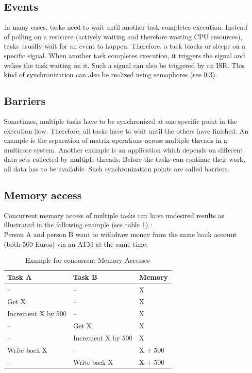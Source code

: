 \subsection{Events}
In many cases, tasks need to wait until another task completes execution.
Instead of polling on a resource (actively waiting and therefore wasting \ac{CPU} resources), tasks usually wait for an event to happen.
Therefore, a task blocks or sleeps on a specific signal.
When another task completes execution, it triggers the signal and wakes the task waiting on it.
Such a signal can also be triggered by an \ac{ISR}.
This kind of synchronization can also be realized using semaphores (see \ref{ss_memory_access}).

\subsection{Barriers}\label{ss_barriers}
Sometimes, multiple tasks have to be synchronized at one specific point in the execution flow.
Therefore, all tasks have to wait until the others have finished.
An example is the separation of matrix operations across multiple threads in a multicore system. 
Another example is an application which depends on different data sets collected by multiple threads.
Before the tasks can continue their work, all data has to be available.
Such synchronization points are called barriers.

\subsection{Memory access}\label{ss_memory_access}
Concurrent memory access of multiple tasks can have undesired results as illustrated in the following example (see table \ref{tab_example_concurrent_memory_access}) :\\
Person A and person B want to withdraw money from the same bank account (both 500 Euros) via an ATM at the same time.

\begin{table}[htbp]
	\centering
		\begin{tabular}{|l|l|l|}
			\hline
				Task A 							& Task B 							& Memory  \\
				\hline 
				-- 									& -- 									& X 			\\
			  Get X 							& -- 									& X				\\
			  Increment X by 500 	& --									& X				\\
			  --									& Get X								& X				\\
		 		--		 							& Increment X by 500	& X				\\
			  Write back X			 	& --									& X	+ 500	\\
			  --									& Write back X				& X + 500	\\				   
			\hline
		\end{tabular}
	\caption{Example for concurrent Memory Accesses}
	\label{tab_example_concurrent_memory_access}
\end{table}

